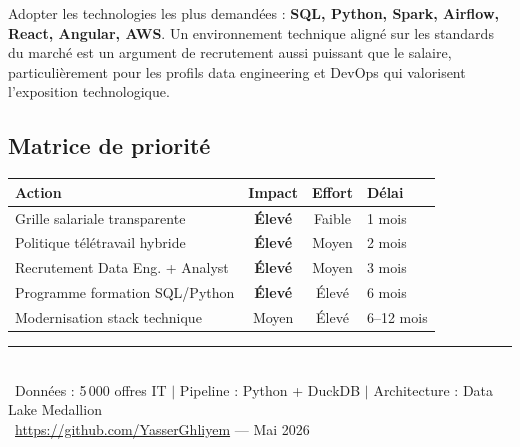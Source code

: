 \documentclass[12pt,a4paper]{article}
\begin{document}
\begin{recobox}
Adopter les technologies les plus demandées : \textbf{SQL, Python, Spark, Airflow, React, Angular, AWS}. Un environnement technique aligné sur les standards du marché est un argument de recrutement aussi puissant que le salaire, particulièrement pour les profils data engineering et DevOps qui valorisent l'exposition technologique.
\end{recobox}

\subsection{Matrice de priorité}

\begin{center}
\renewcommand{\arraystretch}{1.4}
\begin{tabularx}{\textwidth}{X c c l}
\toprule
\textbf{Action} & \textbf{Impact} & \textbf{Effort} & \textbf{Délai} \\
\midrule
Grille salariale transparente & \textcolor{mexgreen}{\textbf{Élevé}} & Faible & 1 mois \\
Politique télétravail hybride & \textcolor{mexgreen}{\textbf{Élevé}} & Moyen & 2 mois \\
Recrutement Data Eng. + Analyst & \textcolor{mexgreen}{\textbf{Élevé}} & Moyen & 3 mois \\
Programme formation SQL/Python & \textcolor{mexgreen}{\textbf{Élevé}} & Élevé & 6 mois \\
Modernisation stack technique & Moyen & Élevé & 6--12 mois \\
\bottomrule
\end{tabularx}
\end{center}

\vfill
\begin{center}
\rule{0.5\textwidth}{0.4pt}\\[0.3cm]
{\small\color{mexgray}\faDatabase~Données : 5\,000 offres IT $\vert$ Pipeline : Python + DuckDB $\vert$ Architecture : Data Lake Medallion}\\[0.2cm]
{\small\color{mexgray}\faGithub~\url{https://github.com/YasserGhliyem} --- Mai 2026}
\end{center}
\end{document}
